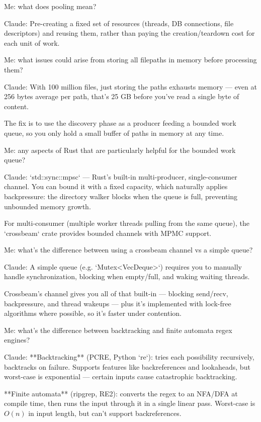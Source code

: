 \documentclass[letterpaper,twocolumn,10pt]{article}
\begin{document}
Me: what does pooling mean?

Claude: Pre-creating a fixed set of resources (threads, DB connections, file descriptors) and reusing them, rather than paying the creation/teardown cost for each unit of work.

Me: what issues could arise from storing all filepaths in memory before processing them?

Claude: With 100 million files, just storing the paths exhausts memory --- even at 256 bytes average per path, that's 25 GB before you've read a single byte of content.

The fix is to use the discovery phase as a producer feeding a bounded work queue, so you only hold a small buffer of paths in memory at any time.

Me: any aspects of Rust that are particularly helpful for the bounded work queue?

Claude: `std::sync::mpsc` --- Rust's built-in multi-producer, single-consumer channel. You can bound it with a fixed capacity, which naturally applies backpressure: the directory walker blocks when the queue is full, preventing unbounded memory growth.

For multi-consumer (multiple worker threads pulling from the same queue), the `crossbeam` crate provides bounded channels with MPMC support.

Me: what's the difference between using a crossbeam channel vs a simple queue?

Claude: A simple queue (e.g. `Mutex<VecDeque>`) requires you to manually handle synchronization, blocking when empty/full, and waking waiting threads. 

Crossbeam's channel gives you all of that built-in --- blocking send/recv, backpressure, and thread wakeups --- plus it's implemented with lock-free algorithms where possible, so it's faster under contention.

Me: what's the difference between backtracking and finite automata regex engines?

Claude: **Backtracking** (PCRE, Python `re`): tries each possibility recursively, backtracks on failure. Supports features like backreferences and lookaheads, but worst-case is exponential --- certain inputs cause catastrophic backtracking.

**Finite automata** (ripgrep, RE2): converts the regex to an NFA/DFA at compile time, then runs the input through it in a single linear pass. Worst-case is $O(n)$ in input length, but can't support backreferences.
\end{document}
